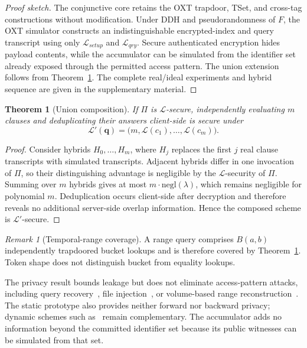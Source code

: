 \documentclass[journal]{IEEEtran}
\theoremstyle{tight}
\newtheorem{theorem}{Theorem}
\theoremstyle{remark}
\newtheorem{remark}{Remark}
\theoremstyle{plain}
\begin{document}
\begin{proof}[Proof sketch]
The conjunctive core retains the OXT trapdoor, TSet, and cross-tag constructions without modification. Under DDH and pseudorandomness of \(F\), the OXT simulator constructs an indistinguishable encrypted-index and query transcript using only \(\mathcal L_{setup}\) and \(\mathcal L_{qry}\). Secure authenticated encryption hides payload contents, while the accumulator can be simulated from the identifier set already exposed through the permitted access pattern. The union extension follows from Theorem~\ref{thm:union}. The complete real/ideal experiments and hybrid sequence are given in the supplementary material.
\end{proof}

\begin{theorem}[Union composition]
\label{thm:union}
If \(\Pi\) is \(\mathcal{L}\)-secure, independently evaluating \(m\) clauses and deduplicating their answers client-side is secure under
\[
\mathcal{L}'(\mathbf q)=
\bigl(m,\mathcal{L}(c_1),\ldots,\mathcal{L}(c_m)\bigr).
\]
\end{theorem}

\begin{proof}
Consider hybrids \(H_0,\ldots,H_m\), where \(H_j\) replaces the first \(j\) real clause transcripts with simulated transcripts. Adjacent hybrids differ in one invocation of \(\Pi\), so their distinguishing advantage is negligible by the \(\mathcal L\)-security of \(\Pi\). Summing over \(m\) hybrids gives at most \(m\cdot\mathrm{negl}(\lambda)\), which remains negligible for polynomial \(m\). Deduplication occurs client-side after decryption and therefore reveals no additional server-side overlap information. Hence the composed scheme is \(\mathcal L'\)-secure.
\end{proof}

\begin{remark}[Temporal-range coverage]
\label{rem:range}
A range query comprises \(B(a,b)\) independently trapdoored bucket lookups and is therefore covered by Theorem~\ref{thm:union}. Token shape does not distinguish bucket from equality lookups.
\end{remark}

The privacy result bounds leakage but does not eliminate access-pattern attacks, including query recovery~\cite{Islam2012,CashLeakage2015}, file injection~\cite{Zhang2016}, or volume-based range reconstruction~\cite{Grubbs2018}. The static prototype also provides neither forward nor backward privacy; dynamic schemes such as~\cite{Guo} remain complementary. The accumulator adds no information beyond the committed identifier set because its public witnesses can be simulated from that set.
\end{document}
